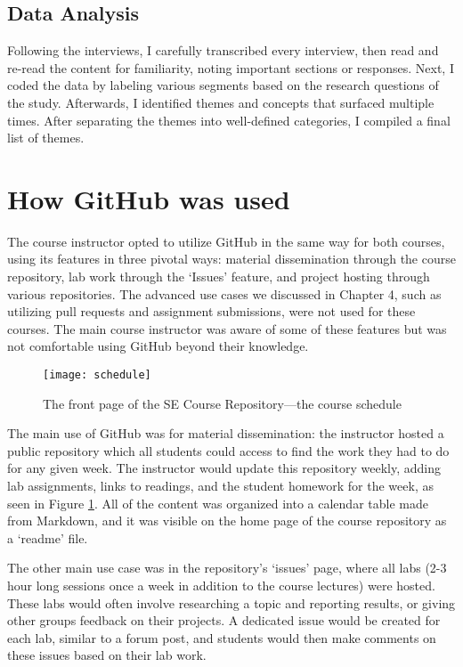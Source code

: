 \subsection{Data Analysis}
Following the interviews, I carefully transcribed every interview, then read and re-read the content for familiarity, noting important sections or responses. Next, I coded the data by labeling various segments based on the research questions of the study. Afterwards, I identified themes and concepts that surfaced multiple times. After separating the themes into well-defined categories, I compiled a final list of themes.



\section{How GitHub was used}
The course instructor opted to utilize GitHub in the same way for both courses, using its features in three pivotal ways: material dissemination through the course repository, lab work through the `Issues' feature, and project hosting through various repositories. The advanced use cases we discussed in Chapter 4, such as utilizing pull requests and assignment submissions, were not used for these courses. The main course instructor was aware of some of these features but was not comfortable using GitHub beyond their knowledge.

\begin{figure}[h!]
 \caption{The front page of the SE Course Repository---the course schedule}
 \centering
   \texttt{[image: schedule]}
 \label{fig:schedule}
\end{figure}

The main use of GitHub was for material dissemination: the instructor hosted a public repository which all students could access to find the work they had to do for any given week. The instructor would update this repository weekly, adding lab assignments, links to readings, and the student homework for the week, as seen in Figure \ref{fig:schedule}. All of the content was organized into a calendar table made from Markdown, and it was visible on the home page of the course repository as a `readme' file.

The other main use case was in the repository's `issues' page, where all labs (2-3 hour long sessions once a week in addition to the course lectures) were hosted. These labs would often involve researching a topic and reporting results, or giving other groups feedback on their projects. A dedicated issue would be created for each lab, similar to a forum post, and students would then make comments on these issues based on their lab work.

